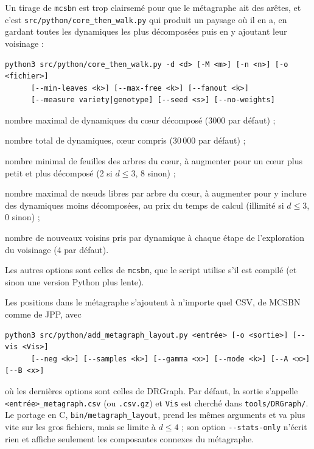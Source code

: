 Un tirage de \texttt{mcsbn} est trop clairsemé pour que le métagraphe ait des arêtes, et c'est \texttt{src/python/core\_then\_walk.py} qui produit un paysage où il en a, en gardant toutes les dynamiques les plus décomposées puis en y ajoutant leur voisinage :
{\small
\begin{verbatim}
python3 src/python/core_then_walk.py -d <d> [-M <m>] [-n <n>] [-o <fichier>]
      [--min-leaves <k>] [--max-free <k>] [--fanout <k>]
      [--measure variety|genotype] [--seed <s>] [--no-weights]
\end{verbatim}
}
\begin{description}
\setlength{\itemsep}{0pt}
\item[\texttt{-M <m>}] nombre maximal de dynamiques du cœur décomposé (3000 par défaut) ;
\item[\texttt{-n <n>}] nombre total de dynamiques, cœur compris (30\,000 par défaut) ;
\item[\texttt{-{}-min-leaves <k>}] nombre minimal de feuilles des arbres du cœur, à augmenter pour un cœur plus petit et plus décomposé (2 si $d\leq 3$, 8 sinon) ;
\item[\texttt{-{}-max-free <k>}] nombre maximal de nœuds libres par arbre du cœur, à augmenter pour y inclure des dynamiques moins décomposées, au prix du temps de calcul (illimité si $d\leq 3$, 0 sinon) ;
\item[\texttt{-{}-fanout <k>}] nombre de nouveaux voisins pris par dynamique à chaque étape de l'exploration du voisinage (4 par défaut).
\end{description}
Les autres options sont celles de \texttt{mcsbn}, que le script utilise s'il est compilé (et sinon une version Python plus lente).

Les positions dans le métagraphe s'ajoutent à n'importe quel CSV, de MCSBN comme de JPP, avec
{\small
\begin{verbatim}
python3 src/python/add_metagraph_layout.py <entrée> [-o <sortie>] [--vis <Vis>]
      [--neg <k>] [--samples <k>] [--gamma <x>] [--mode <k>] [--A <x>] [--B <x>]
\end{verbatim}
}
où les dernières options sont celles de DRGraph.
Par défaut, la sortie s'appelle \texttt{<entrée>\_metagraph.csv} (ou \texttt{.csv.gz}) et \texttt{Vis} est cherché dans \texttt{tools/DRGraph/}.
Le portage en C, \texttt{bin/metagraph\_layout}, prend les mêmes arguments et va plus vite sur les gros fichiers, mais se limite à $d\leq 4$ ; son option \texttt{-{}-stats-only} n'écrit rien et affiche seulement les composantes connexes du métagraphe.


